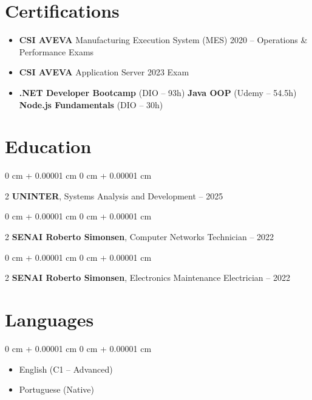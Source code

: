\documentclass[10pt, letterpaper]{article}
\newenvironment{highlights}{ \begin{itemize}[ topsep=0.10 cm, parsep=0.10 cm, partopsep=0pt,
itemsep=0pt, leftmargin=0 cm + 10pt ] }{ \end{itemize} } %
\newenvironment{onecolentry}{ \begin{adjustwidth}{ 0 cm + 0.00001 cm }{ 0 cm + 0.00001 cm }
}{ \end{adjustwidth} } %
\newenvironment{twocolentry}[2][]{ \onecolentry \def\secondColumn{#2} \setcolumnwidth{\fill, 4.5 cm}
\begin{paracol}{2} }{ \switchcolumn \raggedleft \secondColumn \end{paracol}
\endonecolentry } %
\begin{document}
    \section{Certifications}

    \begin{highlights}
        \item \textbf{CSI AVEVA} Manufacturing Execution System (MES) 2020 -- Operations \& Performance Exams
        \item \textbf{CSI AVEVA} Application Server 2023 Exam
        \item \textbf{.NET Developer Bootcamp} (DIO -- 93h) \quad \textbf{Java OOP} (Udemy -- 54.5h) \quad \textbf{Node.js Fundamentals} (DIO -- 30h)
    \end{highlights}

	\section{Education}

	\begin{twocolentry}
		{2023 -- 2025} \textbf{UNINTER}, Systems Analysis and Development
	\end{twocolentry}

	\begin{twocolentry}
		{2021 -- 2022} \textbf{SENAI Roberto Simonsen}, Computer Networks Technician
	\end{twocolentry}

    \begin{twocolentry}
		{2020 -- 2022} \textbf{SENAI Roberto Simonsen}, Electronics Maintenance Electrician
	\end{twocolentry}

	\section{Languages}

	\begin{onecolentry}
		\begin{highlights}
			\item English (C1 -- Advanced)
			\item Portuguese (Native)
		\end{highlights}
	\end{onecolentry}
\end{document}
